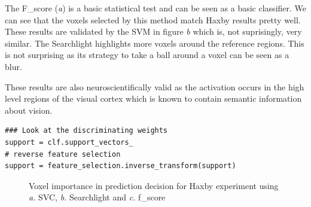 \documentclass{frontiersSCNS} %
\begin{document}
The F\_score (\textit{a}) is a basic statistical test and can be seen as a basic
classifier. We can see that the voxels selected by this method match
Haxby results pretty well. These results are validated by the SVM in figure
\textit{b} which is, not suprisingly, very similar.
The Searchlight highlights more voxels around the reference regions. This is not
surprising as its strategy to take a ball around a voxel can be seen as a blur.

These results are also neuroscientifically valid as the activation occurs in the
high level regions of the visual cortex which is known to contain semantic
information about vision.

\begin{lstlisting}
### Look at the discriminating weights
support = clf.support_vectors_
# reverse feature selection
support = feature_selection.inverse_transform(support)
\end{lstlisting}

\begin{figure}[hbtp]
  \begin{center}
  \end{center}
\caption{Voxel importance in prediction decision for Haxby experiment
using \textit{a.} SVC, \textit{b.} Searchlight and \textit{c.}
f\_score}
\label{fig:haxby}
\end{figure}
\end{document}

